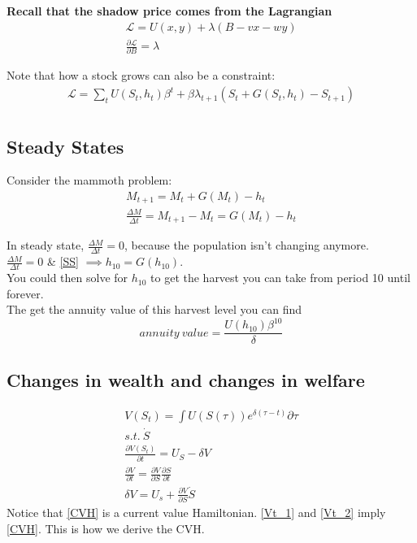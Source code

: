 \documentclass[12pt]{article}
\begin{document}
\textbf{Recall that the shadow price comes from the Lagrangian}
\begin{align}
    \mathcal{L} = U(x,y) + \lambda (B - vx -  wy)\\
    \frac{\partial \mathcal{L}}{\partial B} = \lambda
\end{align}

Note that how a stock grows can also be a constraint:
\begin{align}
    \mathcal{L} = \sum_t U(S_t, h_t) \beta^t + \beta \lambda_{t+1}(S_t + G(S_t, h_t) - S_{t+1})\\
\end{align}

\subsection{Steady States}
Consider the mammoth problem: 
\begin{align}
    M_{t+1} = M_t + G(M_t) - h_t\\
    \frac{\Delta M}{\Delta t} = M_{t+1} - M_t = G(M_t) - h_t \label{SS}
\end{align}

In steady state, $\frac{\Delta M}{\Delta t} = 0$, because the population isn't changing anymore. \\
$\frac{\Delta M}{\Delta t} = 0$ \& \ref{SS} $ \implies h_{10} = G(h_{10})$. \\
You could then solve for $h_{10}$ to get the harvest you can take from period 10 until forever. \\
The get the annuity value of this harvest level you can find 
$$annuity \ value = \frac{U(h_{10}) \beta^{10}}{\delta}$$


\subsection{Changes in wealth and changes in welfare}
\begin{align}
    V(S_t) = \int U(S(\tau))e^{\delta (\tau - t)} \partial \tau \\
    s.t. \ \dot S\\
    \frac{\partial V(S_t)}{\partial t} = U_S - \delta V \label{Vt_1}\\
    \frac{\partial V}{\partial t} = \frac{ \partial V}{\partial S}\frac{\partial S}{\partial t} \label{Vt_2}\\
    \delta V = U_s + \frac{\partial V}{\partial S} \dot S \label{CVH}
\end{align}
Notice that \ref{CVH} is a current value Hamiltonian. \ref{Vt_1} and \ref{Vt_2} imply \ref{CVH}. This is how we derive the CVH. 
\end{document}
